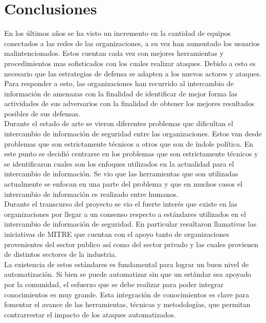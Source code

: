 \section{Conclusiones}

En los últimos años se ha visto un incremento en la cantidad de equipos conectados a las redes de las organizaciones, a su vez han aumentado los usuarios malintencionados. Estos cuentan cada vez con mejores herramientas y procedimientos mas sofisticados con los cuales realizar ataques. Debido a esto es necesario que las estrategias de defensa se adapten a los nuevos actores y ataques. Para responder a esto, las organizaciones han recurrido al intercambio de información de amenazas con la finalidad de identificar de mejor forma las actividades de sus adversarios con la finalidad de obtener los mejores resultados posibles de sus defensas.\\
\bigskip
Durante el estado de arte se vieron diferentes problemas que dificultan el intercambio de información de seguridad entre las organizaciones. Estos van desde problemas que son estrictamente técnicos a otros que son de índole política. En este punto se decidió centrarse en los problemas que son estrictamente técnicos y se identificaron cuales son los enfoques utilizados en la actualidad para el intercambio de información. Se vio que las  herramientas que son utilizadas actualmente se enfocan en una parte del problema y que en muchos casos el intercambio de información es realizado entre humanos.  \\
\bigskip
Durante el transcurso del proyecto se vio el fuerte interés que existe en las organizaciones por llegar a un consenso respecto a estándares utilizados en el intercambio de información de seguridad.  En particular resultaron llamativas las iniciativas de MITRE que cuentan con el apoyo tanto de organizaciones provenientes del sector publico así como del sector privado y las cuales provienen de distintos sectores de la industria.\\   
\bigskip
La existencia de estos estándares es fundamental para lograr un buen nivel de automatización. Si bien se puede automatizar sin que un estándar sea apoyado por la comunidad, el esfuerzo que se debe realizar para poder integrar conocimientos es muy grande. Esta integración de conocimientos es clave para fomentar el avance de las herramientas, técnicas y metodologías, que permitan contrarrestar el impacto de los ataques automatizados.\\
\bigskip
